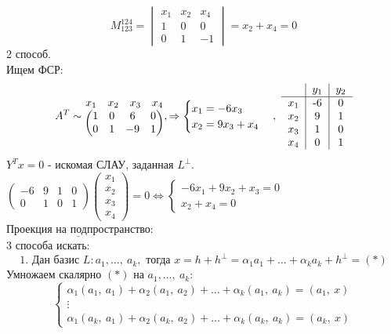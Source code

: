 \documentclass[12pt, letterpaper, twoside]{article}
\newcommand{\Underl}[1]{$\underline{\text{#1}}$}
\begin{document}
\[M_{123}^{124} = \begin{vmatrix}
    x_1 & x_2 & x_4\\
    1 & 0 & 0\\
    0 & 1 & -1
\end{vmatrix} = x_2 + x_4 = 0\]
2 способ.\\
Ищем ФСР:
\[A^T \sim \begin{matrix}
    \begin{matrix}
        x_1 & x_2 & x_3 & x_4
    \end{matrix}\\
    \begin{pmatrix}
        1 & 0 & 6 & 0\\
        0 & 1 & -9 & 1
    \end{pmatrix}
\end{matrix},\Rightarrow \begin{cases}
    x_1 = -6x_3\\
    x_2 = 9x_3 + x_4
\end{cases},\ \begin{tabular}{c|c|c}
    & $y_1$ & $y_2$\\
    \hline
    $x_1$ & -6 & 0\\
    $x_2$ & 9 & 1\\
    $x_3$ & 1 & 0\\
    $x_4$ & 0 & 1
\end{tabular}\]
$Y^Tx = 0$ - искомая СЛАУ, заданная $L^{\bot}$.\\
$\begin{pmatrix}
    -6 & 9 & 1 & 0\\
    0 & 1 & 0 & 1
\end{pmatrix}\begin{pmatrix}
    x_1 \\ x_2 \\ x_3 \\ x_4
\end{pmatrix} = 0\Leftrightarrow \begin{cases}
    -6x_1 + 9x_2 + x_3 = 0\\
    x_2 + x_4 = 0
\end{cases}$
\Underl{Проекция на подпространство}:\\
3 способа искать:
\[\text{1. Дан базис }L: a_1,\dots,\ a_k,\text{ тогда } x = h + h^{\bot} = \alpha_1 a_1 + \dots + \alpha_k a_k + h^{\bot} = (*)\]
Умножаем скалярно $(*)$ на $a_1,\dots,\ a_k$:
\[\begin{cases}
    \alpha_1 (a_1,\ a_1) + \alpha_2 (a_1,\ a_2) + \dots + \alpha_k (a_1,\ a_k) = (a_1,\ x)\\
    \vdots\\
    \alpha_1 (a_k,\ a_1) + \alpha_2 (a_k,\ a_2) + \dots + \alpha_k (a_k,\ a_k) = (a_k,\ x)
\end{cases}\]
\end{document}
